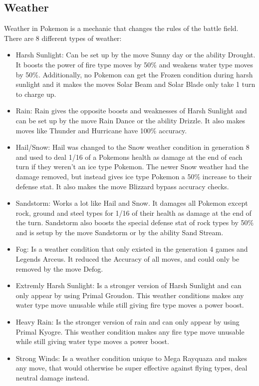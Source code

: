 \subsection{Weather}
Weather in Pokemon is a mechanic that changes the rules of the battle field. There are 8 different types of weather: \cite{Weather}
\begin{itemize}
  \item Harsh Sunlight: Can be set up by the move Sunny day or the ability Drought. It boosts the power of fire type moves by 50\% and weakens 
    water type moves by 50\%. Additionally, no Pokemon can get the Frozen condition during harsh sunlight and it makes the moves Solar Beam and Solar Blade only take 1 turn to charge up.
  \item Rain: Rain gives the opposite boosts and weaknesses of Harsh Sunlight and can be set up by the move Rain Dance or the ability Drizzle. It also makes moves
    like Thunder and Hurricane have 100\% accuracy.
  \item Hail/Snow: Hail was changed to the Snow weather condition in generation 8 and used to deal 1/16 of a Pokemons health as damage at the end of each turn if they weren't an ice 
    type Pokemon. The newer Snow weather had the damage removed, but instead gives ice type Pokemon a 50\% increase to their defense stat. It also makes the move Blizzard bypass accuracy checks.
  \item Sandstorm: Works a lot like Hail and Snow. It damages all Pokemon except rock, ground and steel types for 1/16 of their health as damage at the end of the turn. 
    Sandstorm also boosts the special defense stat of rock types by 50\% and is setup by the move Sandstorm or by the ability Sand Stream.
  \item Fog: Is a weather condition that only existed in the generation 4 games and Legends Arceus. It reduced the Accuracy of all moves, 
    and could only be removed by the move Defog.
  \item Extremly Harsh Sunlight: Is a stronger version of Harsh Sunlight and can only appear by using Primal Groudon. This weather conditions makes any 
    water type move unusable while still giving fire type moves a power boost. 
  \item Heavy Rain: Is the stronger version of rain and can only appear by using Primal Kyogre. This weather condition makes any fire type move unusable 
    while still giving water type moves a power boost.
  \item Strong Winds: Is a weather condition unique to Mega Rayquaza and makes any move, that would otherwise be super effective against flying types, deal neutral damage instead.
\end{itemize}


